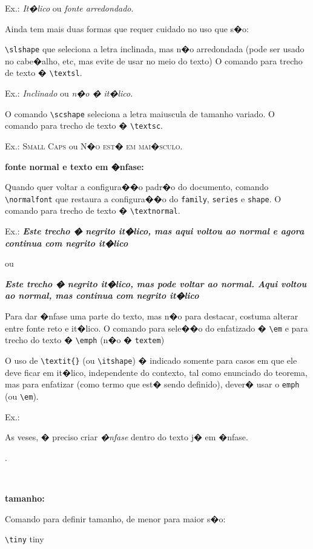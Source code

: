 \documentclass[12pt,a4paper]{article}
\begin{document}
Ex.: \textit{It�lico} ou {\itshape fonte arredondado}.

Ainda tem mais duas formas que requer cuidado no uso que s�o:

\verb|\slshape| que seleciona a letra inclinada, mas n�o arredondada
(pode ser usado no cabe�alho, etc, mas evite de usar no meio do texto)
O comando para trecho de texto � \verb+\textsl+.

Ex.: \textsl{Inclinado} ou {\slshape n�o � it�lico}.

O comando \verb|\scshape| seleciona a letra maiuscula de tamanho variado.
O comando para trecho de texto � \verb+\textsc+.

Ex.: \textsc{Small Caps} ou {\scshape N�o est� em mai�sculo}.

{\bfseries fonte normal e texto em �nfase:}

Quando quer voltar a configura��o padr�o do documento, 
comando \verb|\normalfont| que restaura a configura��o do \verb|family|, \verb|series| e \verb|shape|. 
O comando para trecho de texto � \verb+\textnormal+.

Ex.:
{\bfseries \itshape Este trecho � negrito it�lico, 
mas \textnormal{aqui voltou ao normal} e 
agora continua com negrito it�lico}

ou 

{\bfseries \itshape Este trecho � negrito it�lico, mas pode voltar 
ao normal.
{\normalfont Aqui voltou ao normal}, 
mas continua com negrito it�lico}
 

Para dar �nfase uma parte do texto, mas n�o para destacar, 
costuma alterar entre fonte reto e it�lico.
O comando para sele��o do enfatizado � \verb|\em| e para trecho do texto 
� \verb+\emph+ (n�o � \verb+textem+)

O uso de \verb+\textit{}+ (ou \verb|\itshape|) � indicado somente 
para casos em que ele deve ficar em it�lico, independente do contexto, 
tal como enunciado do teorema, mas para enfatizar 
(como termo que est� sendo definido), dever� usar o \verb+emph+ 
(ou \verb|\em|).

Ex.: 
\begin{em}
  As veses, � preciso criar \emph{�nfase} dentro do texto j� em �nfase. 
\end{em}.

\

{\bfseries tamanho:}

Comando para definir tamanho, de menor para maior s�o:

\verb|\tiny| {\tiny tiny}
\end{document}

